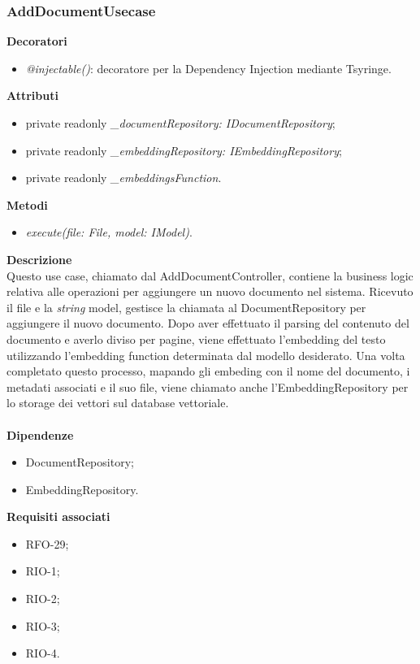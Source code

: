 \subsubsection{AddDocumentUsecase}
\textbf{Decoratori}
\begin{itemize}
    \item \textit{@injectable()}: decoratore per la Dependency Injection mediante Tsyringe.
\end{itemize}
\textbf{Attributi}
\begin{itemize}[itemsep=-4pt]
    \item private readonly \textit{\_documentRepository: IDocumentRepository};
    \item private readonly \textit{\_embeddingRepository: IEmbeddingRepository};
    \item private readonly \textit{\_embeddingsFunction}.
\end{itemize}
\textbf{Metodi}
\begin{itemize}
    \item \textit{execute(file: File, model: IModel)}.
\end{itemize}
\textbf{Descrizione}\\
Questo use case, chiamato dal AddDocumentController, contiene la business logic relativa alle operazioni per aggiungere un nuovo documento nel sistema. Ricevuto il file e la \textit{string} model, gestisce la chiamata al DocumentRepository per aggiungere il nuovo documento. Dopo aver effettuato il parsing del contenuto del documento e averlo diviso per pagine, viene effettuato l'embedding del testo utilizzando l'embedding function determinata dal modello desiderato. Una volta completato questo processo, mapando gli embeding con il nome del documento, i metadati associati e il suo file, viene chiamato anche l'EmbeddingRepository per lo storage dei vettori sul database vettoriale. \\ \\
\textbf{Dipendenze}
\begin{itemize}[itemsep=-4pt]
    \item DocumentRepository;
    \item EmbeddingRepository.
\end{itemize}
\textbf{Requisiti associati}
\begin{itemize}[itemsep=-4pt]
    \item RFO-29;
    \item RIO-1;
    \item RIO-2;
    \item RIO-3;
    \item RIO-4.
\end{itemize}

